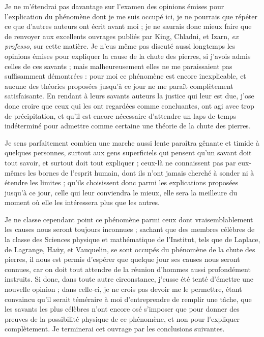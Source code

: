 \documentclass[a4paper, 12pt, oneside, french]{article}
\begin{document}
Je ne m'étendrai pas davantage sur l'examen des opinions émises pour l'explication du phénomène dont je me suis occupé ici, je ne pourrais que répéter ce que d'autres auteurs ont écrit avant moi ; je ne saurais donc mieux faire que de renvoyer aux excellents ouvrages publiés par King, Chladni, et Izarn, \emph{ex professo}, sur cette matière. Je n'eus même pas discuté aussi longtemps les opinions émises pour expliquer la cause de la chute des pierres, si j'avois admis celles de ces savants ; mais malheureusement elles ne me paraissaient pas suffisamment démontrées : pour moi ce phénomène est encore inexplicable, et aucune des théories proposées jusqu'à ce jour ne me paraît complètement satisfaisante. En rendant à leurs savants auteurs la justice qui leur est due, j'ose donc croire que ceux qui les ont regardées comme concluantes, ont agi avec trop de précipitation, et qu'il est encore nécessaire d'attendre un laps de temps indéterminé pour admettre comme certaine une théorie de la chute des pierres.

Je sens parfaitement combien une marche aussi lente paraîtra gênante et timide à quelques personnes, surtout aux gens superficiels qui pensent qu'un savant doit tout savoir, et surtout doit tout expliquer ; ceux-là ne connaissent pas par eux-mêmes les bornes de l'esprit humain, dont ils n'ont jamais cherché à sonder ni à étendre les limites ; qu'ils choisissent donc parmi les explications proposées jusqu'à ce jour, celle qui leur conviendra le mieux, elle sera la meilleure du moment où elle les intéressera plus que les autres.

Je ne classe cependant point ce phénomène parmi ceux dont vraisemblablement les causes nous seront toujours inconnues ; sachant que des membres célèbres de la classe des Sciences physique et mathématique de l'Institut, tels que de Laplace, de Lagrange, Haüy, et Vauquelin, se sont occupés du phénomène de la chute des pierres, il nous est permis d'espérer que quelque jour ses causes nous seront connues, car on doit tout attendre de la réunion d'hommes aussi profondément instruits. Si donc, dans toute autre circonstance, j'eusse été tenté d'émettre une nouvelle opinion ; dans celle-ci, je ne crois pas devoir me le permettre, étant convaincu qu'il serait téméraire à moi d'entreprendre de remplir une tâche, que les savants les plus célèbres n'ont encore osé s'imposer que pour donner des preuves de la possibilité physique de ce phénomène, et non pour l'expliquer complètement. Je terminerai cet ouvrage par les conclusions suivantes.
\end{document}

